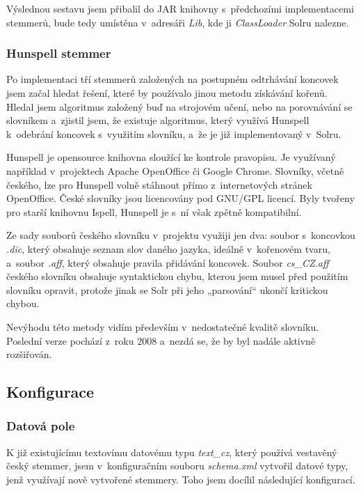 Výslednou sestavu jsem přibalil do JAR knihovny s~předchozími implementacemi stemmerů, bude tedy umístěna v~adresáři \emph{Lib}, kde ji \emph{ClassLoader} Solru nalezne.

\subsubsection{Hunspell stemmer}
Po implementaci tří stemmerů založených na postupném odtrhávání koncovek jsem začal hledat řešení, které by používalo jinou metodu získávání kořenů. Hledal jsem algoritmus založený buď na strojovém učení, nebo na porovnávání se slovníkem a~zjistil jsem, že existuje algoritmus, který využívá Hunspell k~odebrání koncovek s~využitím slovníku, a~že je již implementovaný v~Solru.

Hunspell je opensource knihovna sloužící ke kontrole pravopisu. Je využívaný například v~projektech Apache OpenOffice či Google Chrome. Slovníky, včetně českého, lze pro Hunspell volně stáhnout přímo z~internetových stránek OpenOffice\cite{openoffice}. České slovníky jsou licencovány pod GNU/GPL licencí. Byly tvořeny pro starší knihovnu Ispell, Hunspell je s~ní však zpětně kompatibilní.

Ze sady souborů českého slovníku v~projektu využiji jen dva: soubor s~koncovkou \emph{.dic}, který obsahuje seznam slov daného jazyka, ideálně v~kořenovém tvaru, a~soubor \emph{.aff}, který obsahuje pravila přidávání koncovek\cite{zdrojak}. Soubor \emph{cs\_CZ.aff} českého slovníku obsahuje syntaktickou chybu, kterou jsem musel před použitím slovníku opravit, protože jinak se Solr při jeho „parsování“ ukončí kritickou chybou.

Nevýhodu této metody vidím především v~nedostatečné kvalitě slovníku. Poslední verze pochází z~roku 2008 a~nezdá se, že by byl nadále aktivně rozšiřován.

\subsection{Konfigurace} \label{sorlconfig}
\subsubsection{Datová pole}
K již existujícímu textovímu datovému typu \emph{text\_cz}, který používá vestavěný český stemmer, jsem v~konfiguračním souboru \emph{schema.xml} vytvořil datové typy, jenž využívají nově vytvořené stemmery. Toho jsem docílil následující konfigurací.

